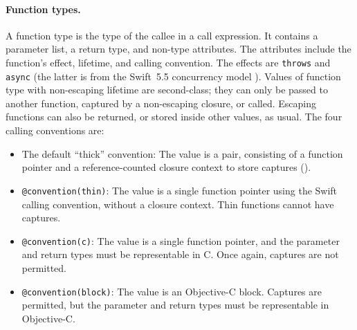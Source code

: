 \documentclass[../generics]{subfiles}
\begin{document}
\paragraph{Function types.} A function type is the type of the callee in a call expression. It contains a parameter list, a return type, and non-type attributes. The attributes include the function's effect, lifetime, and calling convention. The effects are \texttt{throws} and \texttt{async} (the latter is from the Swift~5.5 concurrency model \cite{se0296}). Values of function type with non-escaping lifetime are second-class; they can only be passed to another function, captured by a non-escaping closure, or called. Escaping functions can also be returned, or stored inside other values, as usual. The four calling conventions are:
\begin{itemize}
\item The default ``thick'' convention: The value is a pair, consisting of a function pointer and a reference-counted closure context to store captures ().
\item \texttt{@convention(thin)}: The value is a single function pointer using the Swift calling convention, without a closure context. Thin functions cannot have captures.
\item \texttt{@convention(c)}: The value is a single function pointer, and the parameter and return types must be representable in C. Once again, captures are not permitted.
\item \texttt{@convention(block)}: The value is an Objective-C block. Captures are permitted, but the parameter and return types must be representable in Objective-C.
\end{itemize}
\end{document}
